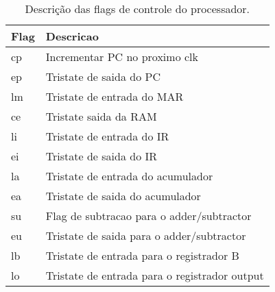 \begin{table}
  \caption{Descrição das flags de controle do processador.}
\begin{tabular}{ll}
\hline
Flag & Descricao \\
\hline
cp & Incrementar PC no proximo clk \\
ep & Tristate de saida do PC \\
lm & Tristate de entrada do MAR \\
ce & Tristate saida da RAM \\
li & Tristate de entrada do IR \\
ei & Tristate de saida do IR \\
la & Tristate de entrada do acumulador \\
ea & Tristate de saida do acumulador \\
su & Flag de subtracao para o adder/subtractor \\
eu & Tristate de saida para o adder/subtractor \\
lb & Tristate de entrada para o registrador B \\
lo & Tristate de entrada para o registrador output \\
\hline
\end{tabular}
\label{t-flags}
\end{table}
